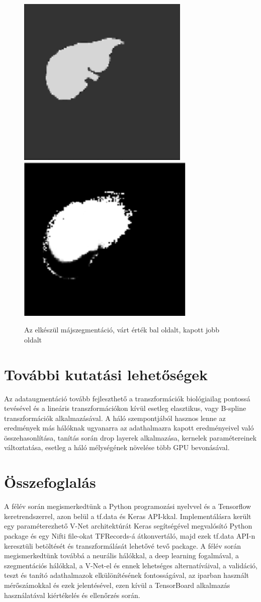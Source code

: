 \documentclass[a4paper]{article}
\begin{document}
	\begin{figure}[!h]
	\centering
	\includegraphics[width=0.3\linewidth]{GoalMask}
	\includegraphics[width=0.32\linewidth]{PredictedMask}
	\caption{Az elkészül májszegmentáció, várt érték bal oldalt, kapott jobb oldalt}
	\label{fig:outputmask}
\end{figure}
	\section{További kutatási lehetőségek}
	Az adataugmentáció tovább fejleszthető a transzformációk biológiailag pontossá tevésével és a lineáris transzformációkon kívül esetleg elasztikus, vagy B-spline transzformációk alkalmazásával.
	A háló szempontjából hasznos lenne az eredmények más hálóknak ugyanarra az adathalmazra kapott eredményeivel való összehasonlítása, tanítás során drop layerek alkalmazása, kernelek paramétereinek változtatása, esetleg a háló mélységének növelése több GPU bevonásával.
	\section{Összefoglalás}
	A félév során megismerkedtünk a Python programozási nyelvvel és a Tensorflow keretrendszerrel, azon belül a tf.data és Keras API-kkal. Implementálásra került egy paraméterezhető V-Net architektúrát Keras segítségével megvalósító Python package és egy Nifti file-okat TFRecords-á átkonvertáló, majd ezek tf.data API-n keresztüli betöltését és transzformálását lehetővé tevő package. A félév során megismerkedtünk továbbá a neurális hálókkal, a deep learning fogalmával, a szegmentációs hálókkal, a V-Net-el és ennek lehetséges alternatíváival, a validáció, teszt és tanító adathalmazok elkülönítésének fontosságával, az iparban használt mérőszámokkal és ezek jelentésével, ezen kívül a TensorBoard alkalmazás használatával kiértékelés és ellenőrzés során. 
	\pagebreak
	{}
	
	
\end{document}
